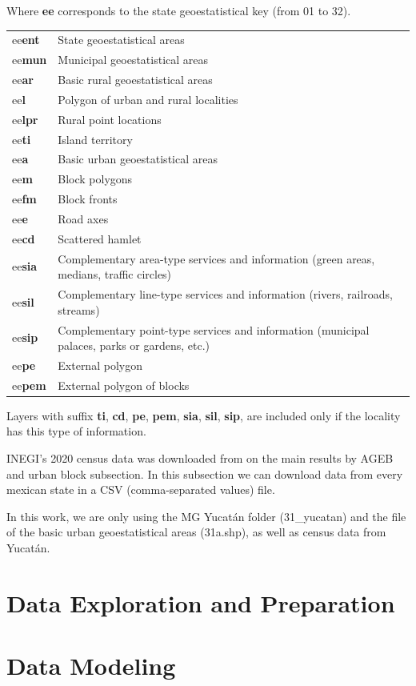 Where \textbf{ee} corresponds to the state geoestatistical key (from 01 to 32).

\begin{table}[h!]
	\centering
	\label{tab:MG_filenames}
	\footnotesize
	\begin{tabular}{ l l }
		ee\textbf{ent} & State geoestatistical areas \\
		ee\textbf{mun} & Municipal geoestatistical areas \\
		ee\textbf{ar} & Basic rural geoestatistical areas \\
		ee\textbf{l} & Polygon of urban and rural localities \\
		ee\textbf{lpr} & Rural point locations \\
		ee\textbf{ti} & Island territory\\
		ee\textbf{a} & Basic urban geoestatistical areas \\
		ee\textbf{m} & Block polygons\\
		ee\textbf{fm} & Block fronts \\
		ee\textbf{e} & Road axes \\
		ee\textbf{cd} & Scattered hamlet \\
		ee\textbf{sia} & Complementary area-type services and information (green areas, medians, traffic circles) \\
		ee\textbf{sil} & Complementary line-type services and information
		(rivers, railroads, streams) \\
		ee\textbf{sip} & Complementary point-type services and information
		(municipal palaces, parks or gardens, etc.) \\
		ee\textbf{pe} & External polygon \\
		ee\textbf{pem} & External polygon of blocks \\
	\end{tabular}
\end{table}

Layers with suffix \textbf{ti}, \textbf{cd}, \textbf{pe}, \textbf{pem}, \textbf{sia}, \textbf{sil}, \textbf{sip}, are included only if the locality has this type of information.

INEGI's 2020 census data was downloaded from \cite{2020census} on the main results by AGEB and urban block subsection. In this subsection we can download data from every mexican state in a CSV (comma-separated values) file.

In this work, we are only using the MG Yucatán folder (31\_yucatan) and the file of the basic urban geoestatistical areas (31a.shp), as well as census data from Yucatán.


\section{Data Exploration and Preparation}


\section{Data Modeling}


